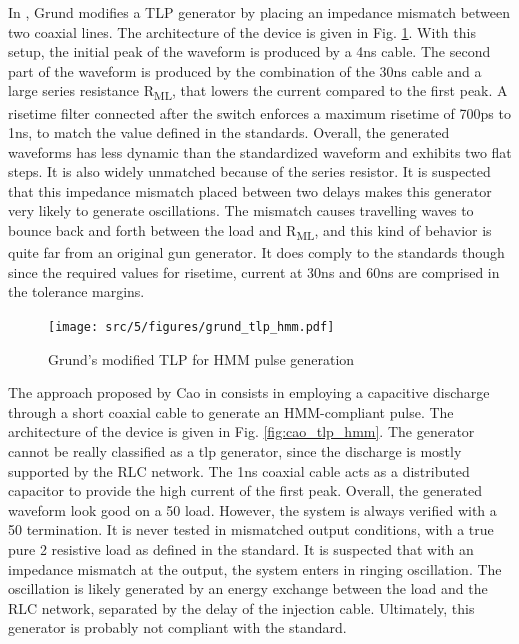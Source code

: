 In \cite{iec61000-tlp}, Grund modifies a TLP generator by placing an impedance mismatch between two coaxial lines.
The architecture of the device is given in Fig. \ref{fig:grund_tlp_hmm}.
With this setup, the initial peak of the waveform is produced by a 4ns cable.
The second part of the waveform is produced by the combination of the 30ns cable and a large series resistance R\textsubscript{ML}, that lowers the current compared to the first peak.
A risetime filter connected after the switch enforces a maximum risetime of 700ps to 1ns, to match the value defined in the standards.
Overall, the generated waveforms has less dynamic than the standardized waveform and exhibits two flat steps.
It is also widely unmatched because of the series resistor.
It is suspected that this impedance mismatch placed between two delays makes this generator very likely to generate oscillations.
The mismatch causes travelling waves to bounce back and forth between the load and R\textsubscript{ML}, and this kind of behavior is quite far from an original gun generator.
It does comply to the standards though since the required values for risetime, current at 30ns and 60ns are comprised in the tolerance margins.

\begin{figure}[!h]
  \centering
  \texttt{[image: src/5/figures/grund\_tlp\_hmm.pdf]}
  \caption{Grund's modified TLP for HMM pulse generation}
  \label{fig:grund_tlp_hmm}
\end{figure}

The approach proposed by Cao in \cite{tlp-based-hmm} consists in employing a capacitive discharge through a short coaxial cable to generate an HMM-compliant pulse.
The architecture of the device is given in Fig. \ref{fig:cao_tlp_hmm}.
The generator cannot be really classified as a \gls{tlp} generator, since the discharge is mostly supported by the RLC network. The 1ns coaxial cable acts as a distributed capacitor to provide the high current of the first peak.
Overall, the generated waveform look good on a 50\textOmega{} load.
However, the system is always verified with a 50\textOmegae{} termination.
It is never tested in mismatched output conditions, with a true pure 2\textOmega{} resistive load as defined in the standard.
It is suspected that with an impedance mismatch at the output, the system enters in ringing oscillation.
The oscillation is likely generated by an energy exchange between the load and the RLC network, separated by the delay of the injection cable.
Ultimately, this generator is probably not compliant with the standard.

